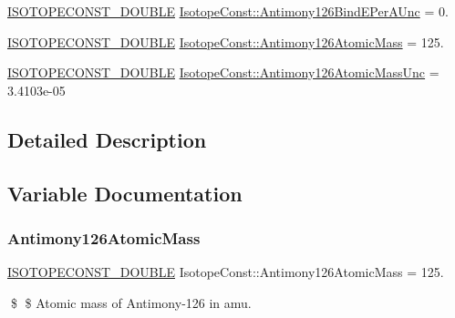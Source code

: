 \begin{DoxyCompactItemize}
\mbox{\hyperlink{group___isotope_const-_macros_ga8f45a7272ce02c0b4c65c44636ed719a}{I\+S\+O\+T\+O\+P\+E\+C\+O\+N\+S\+T\+\_\+\+D\+O\+U\+B\+LE}} \mbox{\hyperlink{group___isotope_const-_antimony-_sb126_ga7c0811d44fe013b7c83d1bb749bf79a0}{Isotope\+Const\+::\+Antimony126\+Bind\+E\+Per\+A\+Unc}} = 0.
\item 
\mbox{\hyperlink{group___isotope_const-_macros_ga8f45a7272ce02c0b4c65c44636ed719a}{I\+S\+O\+T\+O\+P\+E\+C\+O\+N\+S\+T\+\_\+\+D\+O\+U\+B\+LE}} \mbox{\hyperlink{group___isotope_const-_antimony-_sb126_ga3b1e720adb73b91cf3d9d7738c703fb6}{Isotope\+Const\+::\+Antimony126\+Atomic\+Mass}} = 125.
\item 
\mbox{\hyperlink{group___isotope_const-_macros_ga8f45a7272ce02c0b4c65c44636ed719a}{I\+S\+O\+T\+O\+P\+E\+C\+O\+N\+S\+T\+\_\+\+D\+O\+U\+B\+LE}} \mbox{\hyperlink{group___isotope_const-_antimony-_sb126_gadc5bcef0c3a8d10d91dc04cd55dc32d4}{Isotope\+Const\+::\+Antimony126\+Atomic\+Mass\+Unc}} = 3.\+4103e-\/05
\end{DoxyCompactItemize}


\subsection{Detailed Description}


\subsection{Variable Documentation}
\mbox{\label{group___isotope_const-_antimony-_sb126_ga3b1e720adb73b91cf3d9d7738c703fb6}} 
\subsubsection{\texorpdfstring{Antimony126\+Atomic\+Mass}{Antimony126AtomicMass}}
{\footnotesize\ttfamily \mbox{\hyperlink{group___isotope_const-_macros_ga8f45a7272ce02c0b4c65c44636ed719a}{I\+S\+O\+T\+O\+P\+E\+C\+O\+N\+S\+T\+\_\+\+D\+O\+U\+B\+LE}} Isotope\+Const\+::\+Antimony126\+Atomic\+Mass = 125.}

\$ \$ Atomic mass of Antimony-\/126 in amu. \mbox{\label{group___isotope_const-_antimony-_sb126_gadc5bcef0c3a8d10d91dc04cd55dc32d4}} 
